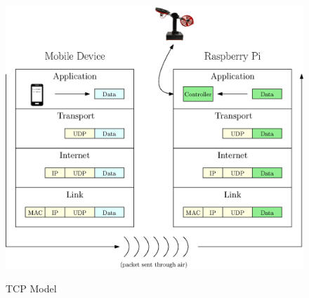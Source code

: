 \begin{figure}[!htbp]
    \centering
    \includegraphics[width=.46\textwidth,keepaspectratio=true]{figs/ipe/TCPModel.eps}
    \label{fig:TCPModel}
    \caption{TCP Model}
\end{figure}


